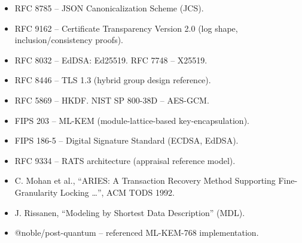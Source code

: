 \documentclass[11pt]{article}
\begin{document}
\begin{itemize}
  \item RFC 8785 -- JSON Canonicalization Scheme (JCS).
  \item RFC 9162 -- Certificate Transparency Version 2.0 (log shape,
    inclusion/consistency proofs).
  \item RFC 8032 -- EdDSA: Ed25519. \quad RFC 7748 -- X25519.
  \item RFC 8446 -- TLS 1.3 (hybrid group design reference).
  \item RFC 5869 -- HKDF. \quad NIST SP 800-38D -- AES-GCM.
  \item FIPS 203 -- ML-KEM (module-lattice-based key-encapsulation).
  \item FIPS 186-5 -- Digital Signature Standard (ECDSA, EdDSA).
  \item RFC 9334 -- RATS architecture (appraisal reference model).
  \item C. Mohan et al., ``ARIES: A Transaction Recovery Method Supporting
    Fine-Granularity Locking \ldots'', ACM TODS 1992.
  \item J. Rissanen, ``Modeling by Shortest Data Description'' (MDL).
  \item @noble/post-quantum -- referenced ML-KEM-768 implementation.
\end{itemize}
\end{document}
